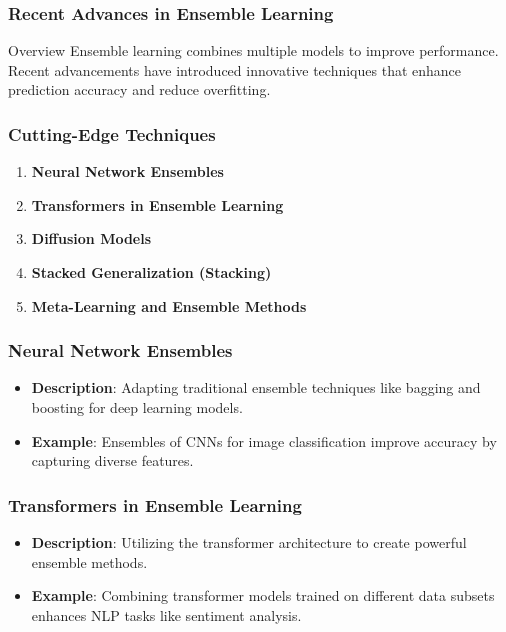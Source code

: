 \documentclass[aspectratio=169]{beamer}
\begin{document}
\begin{frame}[fragile]
    \frametitle{Recent Advances in Ensemble Learning}
    \begin{block}{Overview}
        Ensemble learning combines multiple models to improve performance. Recent advancements have introduced innovative techniques that enhance prediction accuracy and reduce overfitting.
    \end{block}
\end{frame}

\begin{frame}[fragile]
    \frametitle{Cutting-Edge Techniques}
    \begin{enumerate}
        \item \textbf{Neural Network Ensembles}
        \item \textbf{Transformers in Ensemble Learning}
        \item \textbf{Diffusion Models}
        \item \textbf{Stacked Generalization (Stacking)}
        \item \textbf{Meta-Learning and Ensemble Methods}
    \end{enumerate}
\end{frame}

\begin{frame}[fragile]
    \frametitle{Neural Network Ensembles}
    \begin{itemize}
        \item \textbf{Description}: Adapting traditional ensemble techniques like bagging and boosting for deep learning models.
        \item \textbf{Example}: Ensembles of CNNs for image classification improve accuracy by capturing diverse features.
    \end{itemize}
\end{frame}

\begin{frame}[fragile]
    \frametitle{Transformers in Ensemble Learning}
    \begin{itemize}
        \item \textbf{Description}: Utilizing the transformer architecture to create powerful ensemble methods.
        \item \textbf{Example}: Combining transformer models trained on different data subsets enhances NLP tasks like sentiment analysis.
    \end{itemize}
\end{frame}
\end{document}

